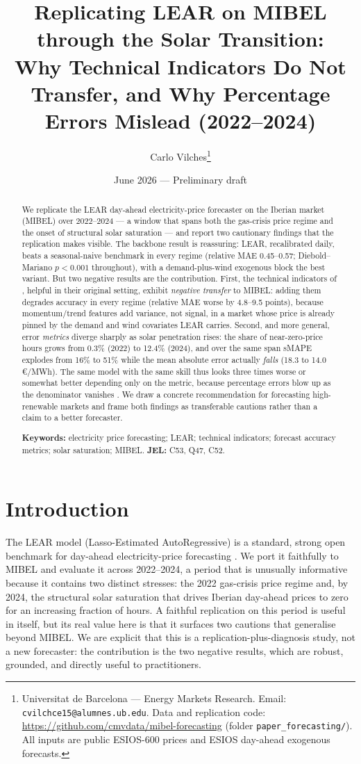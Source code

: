 \documentclass[11pt,a4paper]{article}
\title{Replicating LEAR on MIBEL through the Solar Transition: \\
Why Technical Indicators Do Not Transfer, and Why Percentage
Errors Mislead (2022--2024)}
\author{Carlo Vilches\thanks{Universitat de Barcelona --- Energy Markets Research.
Email: \texttt{cvilchce15@alumnes.ub.edu}. Data and replication code:
\url{https://github.com/cmvdata/mibel-forecasting} (folder
\texttt{paper\_forecasting/}). All inputs are public ESIOS-600 prices and ESIOS
day-ahead exogenous forecasts.}}
\date{June 2026 --- Preliminary draft}
\begin{document}
\maketitle

\begin{abstract}
\noindent We replicate the LEAR day-ahead electricity-price forecaster
\citep{lago2021} on the Iberian market (MIBEL) over 2022--2024 --- a window that
spans both the gas-crisis price regime and the onset of structural solar
saturation --- and report two cautionary findings that the replication makes
visible. The backbone result is reassuring: LEAR, recalibrated daily, beats a
seasonal-naive benchmark in every regime (relative MAE 0.45--0.57; Diebold--Mariano
$p<0.001$ throughout), with a demand-plus-wind exogenous block the best variant.
But two negative results are the contribution. First, the technical indicators of
\citet{demir2020}, helpful in their original setting, exhibit \emph{negative
transfer} to MIBEL: adding them degrades accuracy in every regime (relative MAE
worse by 4.8--9.5 points), because momentum/trend features add variance, not
signal, in a market whose price is already pinned by the demand and wind covariates
LEAR carries. Second, and more general, error \emph{metrics} diverge sharply as
solar penetration rises: the share of near-zero-price hours grows from 0.3\% (2022)
to 12.4\% (2024), and over the same span sMAPE explodes from 16\% to 51\% while the
mean absolute error actually \emph{falls} (18.3 to 14.0\,\euro/MWh). The same model
with the same skill thus looks three times worse or somewhat better depending only
on the metric, because percentage errors blow up as the denominator vanishes
\citep{hyndmankoehler2006}. We draw a concrete recommendation for forecasting
high-renewable markets and frame both findings as transferable cautions rather than
a claim to a better forecaster.

\medskip
\noindent\textbf{Keywords:} electricity price forecasting; LEAR; technical
indicators; forecast accuracy metrics; solar saturation; MIBEL.
\quad\textbf{JEL:} C53, Q47, C52.
\end{abstract}

\section{Introduction}

The LEAR model (Lasso-Estimated AutoRegressive) is a standard, strong open
benchmark for day-ahead electricity-price forecasting \citep{lago2021}. We port it
faithfully to MIBEL and evaluate it across 2022--2024, a period that is unusually
informative because it contains two distinct stresses: the 2022 gas-crisis price
regime and, by 2024, the structural solar saturation that drives Iberian
day-ahead prices to zero for an increasing fraction of hours. A faithful
replication on this period is useful in itself, but its real value here is that it
surfaces two cautions that generalise beyond MIBEL. We are explicit that this is a
replication-plus-diagnosis study, not a new forecaster: the contribution is the two
negative results, which are robust, grounded, and directly useful to practitioners.
\end{document}
